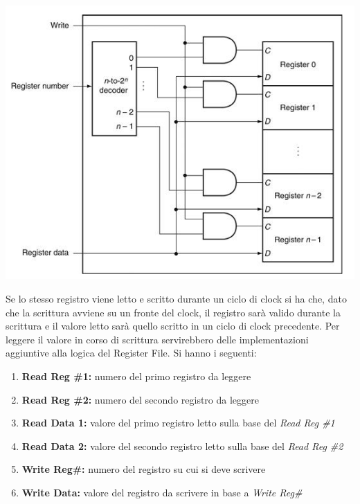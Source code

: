 \documentclass[a4paper,12pt, oneside]{book}
\begin{document}
\begin{itemize}
\begin{center}
\includegraphics[scale=0.6]{img/reg3.png}
\end{center}
\newpage
Se lo stesso registro viene letto e scritto durante un ciclo di clock si ha che, dato che la scrittura avviene su un fronte del clock, il registro sarà valido durante la scrittura e il valore letto sarà quello scritto in un ciclo di clock precedente. Per leggere il valore in corso di scrittura servirebbero delle implementazioni aggiuntive alla logica del Register File. Si hanno i seguenti:
\begin{enumerate}
\item \textbf{Read Reg \#1:} numero del primo registro da leggere
\item \textbf{Read Reg \#2:} numero del secondo registro da leggere
\item \textbf{Read Data 1:} valore del primo registro letto sulla base del \textit{Read Reg \#1}
\item \textbf{Read Data 2:} valore del secondo registro letto sulla base del \textit{Read Reg \#2}
\item \textbf{Write Reg\#:} numero del registro su cui si deve scrivere
\item \textbf{Write Data: } valore del registro da scrivere in base a \textit{Write Reg\#}
\end{enumerate}

\end{itemize}
\end{document}
